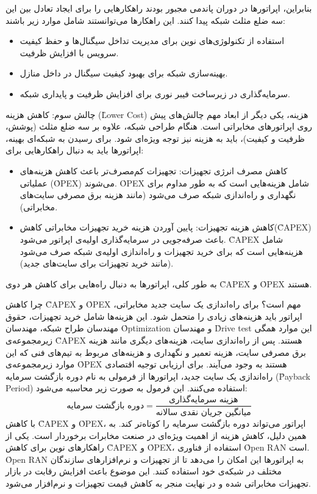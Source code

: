 \documentclass[landscape, 12pt]{report}
\begin{document}
بنابراین، اپراتورها در دوران پاندمی مجبور بودند راهکارهایی را برای ایجاد تعادل بین این سه ضلع مثلث شبکه پیدا کنند. این راهکارها می‌توانستند شامل موارد زیر باشند:
\begin{itemize}
\item استفاده از تکنولوژی‌های نوین برای مدیریت تداخل سیگنال‌ها و حفظ کیفیت سرویس با افزایش ظرفیت.
\item بهینه‌سازی شبکه برای بهبود کیفیت سیگنال در داخل منازل.
\item سرمایه‌گذاری در زیرساخت فیبر نوری برای افزایش ظرفیت و پایداری شبکه.
\end{itemize}

چالش سوم: کاهش هزینه (\r{Lower Cost})
هزینه، یکی دیگر از ابعاد مهم چالش‌های پیش روی اپراتورهای مخابراتی است. هنگام طراحی شبکه، علاوه بر سه ضلع مثلث (پوشش، ظرفیت و کیفیت)، باید به هزینه نیز توجه ویژه‌ای شود.
برای رسیدن به شبکه‌ای بهینه، اپراتورها باید به دنبال راهکارهایی برای:
\begin{itemize}
\item کاهش مصرف انرژی تجهیزات: تجهیزات کم‌مصرف‌تر باعث کاهش هزینه‌های عملیاتی (\r{OPEX}) می‌شوند. \r{OPEX} شامل هزینه‌هایی است که به طور مداوم برای نگهداری و راه‌اندازی شبکه صرف می‌شود (مانند هزینه برق مصرفی سایت‌های مخابراتی).
\item کاهش هزینه تجهیزات: پایین آوردن هزینه خرید تجهیزات مخابراتی کاهش(\r{CAPEX}) باعث صرفه‌جویی در سرمایه‌گذاری اولیه‌ی اپراتور می‌شود. \r{CAPEX} شامل هزینه‌هایی است که برای خرید تجهیزات و راه‌اندازی اولیه‌ی شبکه صرف می‌شود (مانند خرید تجهیزات برای سایت‌های جدید).
\end{itemize}

به طور کلی، اپراتورها به دنبال راه‌هایی برای کاهش هر دوی \r{CAPEX} و \r{OPEX} هستند.

چرا کاهش \r{CAPEX} و \r{OPEX} مهم است؟
برای راه‌اندازی یک سایت جدید مخابراتی، اپراتور باید هزینه‌های زیادی را متحمل شود. این هزینه‌ها شامل خرید تجهیزات، حقوق مهندسان طراح شبکه، مهندسان \r{Optimization} و مهندسان \r{Drive test} این موارد همگی زیرمجموعه‌ی \r{CAPEX} هستند.
پس از راه‌اندازی سایت، هزینه‌های دیگری مانند هزینه برق مصرفی سایت، هزینه تعمیر و نگهداری و هزینه‌های مربوط به تیم‌های فنی که این موارد زیرمجموعه‌ی \r{OPEX} هستند به وجود می‌آیند.
برای ارزیابی توجیه اقتصادی راه‌اندازی یک سایت جدید، اپراتورها از فرمولی به نام دوره بازگشت سرمایه (\r{Payback Period}) استفاده می‌کنند. این فرمول به صورت زیر محاسبه می‌شود:
\[
\text{دوره بازگشت سرمایه} = \frac{\text{هزینه سرمایه‌گذاری}}{\text{میانگین جریان نقدی سالانه}}
\]
با کاهش \r{CAPEX} و \r{OPEX}، اپراتور می‌تواند دوره بازگشت سرمایه را کوتاه‌تر کند. به همین دلیل، کاهش هزینه از اهمیت ویژه‌ای در صنعت مخابرات برخوردار است.
یکی از راهکارهای نوین برای کاهش \r{CAPEX} و \r{OPEX}، استفاده از فناوری \r{Open RAN} است. \r{Open RAN} به اپراتورها این امکان را می‌دهد تا از تجهیزات و نرم‌افزارهای سازندگان مختلف در شبکه‌ی خود استفاده کنند. این موضوع باعث افزایش رقابت در بازار تجهیزات مخابراتی شده و در نهایت منجر به کاهش قیمت تجهیزات و نرم‌افزار می‌شود.
\end{document}
